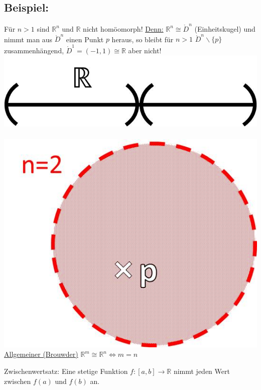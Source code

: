 \documentclass[a4paper,11pt,notitlepage]{report}
\theoremstyle{definition}
\newcommand{\R}{{\ensuremath{\mathbb{R}}}}
\newenvironment{bsp}[1]
{
\setlength{\fboxsep}{10pt}
\subsection*{Beispiel: #1}
\begin{upshape}
}
{
\end{upshape}
}
\begin{document}
\begin{bsp}{}
	Für $n > 1$ sind $\R^n$ und $\R$ nicht homöomorph!
	\newline
	\underline{Denn:} $\R^n \cong \mathring{D}^n$ (Einheitskugel) und nimmt man aus $\mathring{D}^n$ einen Punkt $p$ heraus, so bleibt für $n>1$ $\mathring{D}^n \backslash \{p\}$ zusammenhängend, $\mathring{D}^1 = (-1,1) \cong \R$ aber nicht!
	\newline
\includegraphics[scale=0.4]{images/R_ohne_p.jpg}$\qquad\qquad$
\includegraphics[scale=0.4]{images/R2_ohne_p.jpg}
	\newline
	\underline{Allgemeiner (Brouwder)} $\R^m \cong \R^n \Leftrightarrow m=n$
\end{bsp}

\begin{corollary}{Zwischenwertsatz:}
	Eine stetige Funktion $f \colon [a,b] \rightarrow \R$ nimmt jeden Wert zwischen $f(a)$ und $f(b)$ an.
\end{corollary}
\end{document}
